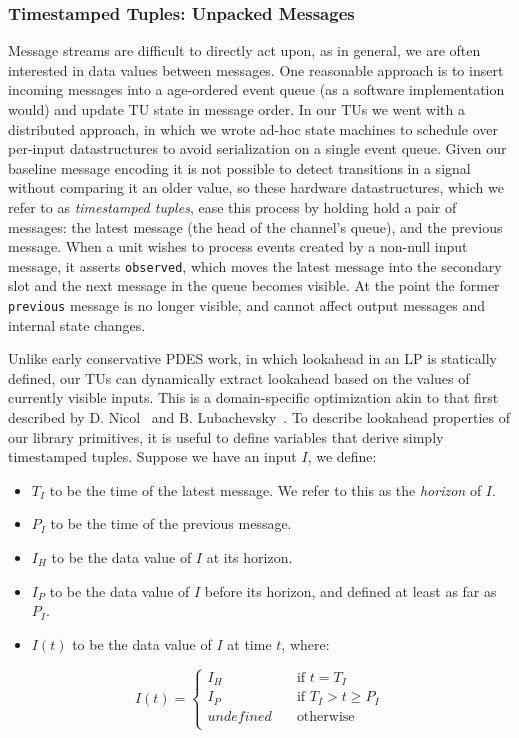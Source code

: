 \subsubsection{Timestamped Tuples: Unpacked Messages}
Message streams are difficult to directly act upon, as in general, we are often interested
in data values between messages. One reasonable approach is to insert incoming messages into a
age-ordered event queue (as a software implementation would) and update TU state in message order.
In our TUs we went with a distributed approach, in which we wrote ad-hoc state machines to schedule over per-input
datastructures to avoid serialization on a single event queue.
Given our baseline message encoding it is not possible to
detect transitions in a signal without comparing it an older value, so these
hardware datastructures, which we refer to as \emph{timestamped tuples}, ease
this process by holding hold a pair of messages: the latest message (the head
of the channel's queue), and the previous message. When a unit wishes to
process events created by a non-null input message, it asserts \texttt{observed},
which moves the latest message into the secondary slot and the next message in
the queue becomes visible. At the point the former \texttt{previous} message is no longer visible,
and cannot affect output messages and internal state changes.

Unlike early conservative PDES work, in which lookahead in an LP is statically
defined, our TUs can dynamically extract lookahead based on the values of
currently visible inputs. This is a domain-specific optimization akin to that
first described by D. Nicol~\cite{ImplicitLookahead} and B.
Lubachevsky~\cite{ImplicitLookahead2}. To describe lookahead properties of our
library primitives, it is useful to define variables that derive simply
timestamped tuples. Suppose we have an input $I$, we define:

\begin{itemize}
    \item $T_{I}$ to be the time of the latest message. We refer to this as the \emph{horizon} of $I$.
    \item $P_{I}$ to be the time of the previous message.
    \item $I_H$ to be the data value of $I$ at its horizon.
    \item $I_P$ to be the data value of $I$ before its horizon, and defined at least as far as $P_I$.
    \item $I(t)$ to be the data value of $I$ at time $t$, where:
\end{itemize}
\[ I(t) = \begin{cases}
    I_H & \quad \text{if } t = T_{I} \\
    I_P & \quad \text{if }  T_{I} > t \geq P_{I} \\
    undefined & \quad \text{otherwise} \\
\end{cases}
\]

